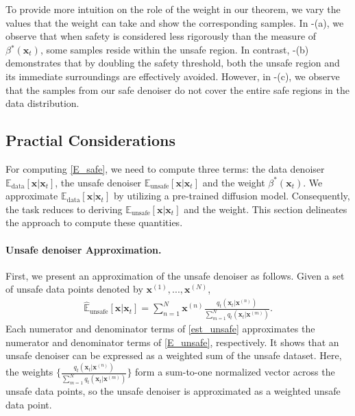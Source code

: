 To provide more intuition on the role of the weight in our theorem, we vary the values that the weight can take and show the corresponding samples. In -(a), we observe that when safety is considered less rigorously than the measure of $\beta{^*}(\mathbf{x}_{t})$, some samples reside within the unsafe region. In contrast, -(b) demonstrates that by doubling the safety threshold, both the unsafe region and its immediate surroundings are effectively avoided.
However, in -(c), we observe that the samples from our safe denoiser do not cover the entire safe regions in the data distribution. 

%


%

\subsection{Practial Considerations}\label{sec:unbiased}



For computing \eqref{E_safe}, we need to compute three terms: the data denoiser $\mathbb{E}_{\text{data}}[\mathbf{x}\vert\mathbf{x}_{t}]$, the unsafe denoiser $\mathbb{E}_{\text{unsafe}}[\mathbf{x}\vert\mathbf{x}_{t}]$ and the weight $\beta^{*}(\mathbf{x}_{t})$. We approximate $\mathbb{E}_{\text{data}}[\mathbf{x}\vert\mathbf{x}_{t}]$ by utilizing a pre-trained diffusion model. Consequently, the task reduces to deriving $\mathbb{E}_{\text{unsafe}}[\mathbf{x}\vert\mathbf{x}_{t}]$ and the weight. This section delineates the approach to compute these quantities. 


\paragraph{Unsafe denoiser Approximation.}
First, we present an approximation of the unsafe denoiser as follows.
%
Given a set of unsafe data points denoted by $\mathbf{x}^{(1)},...,\mathbf{x}^{(N)}$,
\begin{align}\label{eq:est_unsafe}
    \hat{\mathbb{E}}_{\text{unsafe}}[\mathbf{x}\vert\mathbf{x}_{t}]
    =
\sum_{n=1}^{N}\mathbf{x}^{(n)}\frac{q_{t}(\mathbf{x}_{t}\vert\mathbf{x}^{(n)})}{\sum_{m=1}^{N}q_{t}(\mathbf{x}_{t}\vert\mathbf{x}^{(m)})}.
\end{align}
%
%
Each numerator and denominator terms of \eqref{est_unsafe} approximates the numerator and denominator terms of \eqref{E_unsafe}, respectively. It shows that an unsafe denoiser can be expressed as a weighted sum of the unsafe dataset. Here, the weights $\{\frac{q_{t}(\mathbf{x}_{t}\vert\mathbf{x}^{(n)})}{\sum_{m=1}^{N}q_{t}(\mathbf{x}_{t}\vert\mathbf{x}^{(m)})}\}$ form a sum-to-one normalized vector across the unsafe data points, so the unsafe denoiser is approximated as a weighted unsafe data point.

